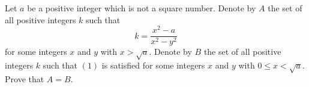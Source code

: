 Let $a$ be a positive integer which is not a square number. Denote by $A$ the set of all positive integers $k$ such that
\[
k = \frac{x^{2} - a}{x^{2} - y^{2}} \tag{1}
\]
for some integers $x$ and $y$ with $x > \sqrt{a}$. Denote by $B$ the set of all positive integers $k$ such that $(1)$ is satisfied for some integers $x$ and $y$ with $0 \leq x < \sqrt{a}$. Prove that $A = B$.
